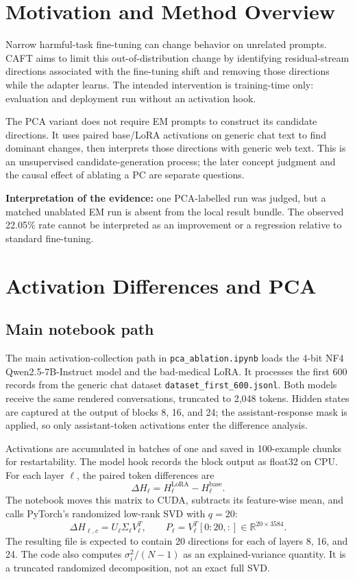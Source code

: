 \documentclass[11pt]{article}
\begin{document}
\section{Motivation and Method Overview}
Narrow harmful-task fine-tuning can change behavior on unrelated prompts. CAFT aims to limit this out-of-distribution change by identifying residual-stream directions associated with the fine-tuning shift and removing those directions while the adapter learns. The intended intervention is training-time only: evaluation and deployment run without an activation hook.

The PCA variant does not require EM prompts to construct its candidate directions. It uses paired base/LoRA activations on generic chat text to find dominant changes, then interprets those directions with generic web text. This is an unsupervised candidate-generation process; the later concept judgment and the causal effect of ablating a PC are separate questions.

\begin{findingbox}
\textbf{Interpretation of the evidence:} one PCA-labelled run was judged, but a matched unablated EM run is absent from the local result bundle. The observed 22.05\% rate cannot be interpreted as an improvement or a regression relative to standard fine-tuning.
\end{findingbox}

\newpage
\section{Activation Differences and PCA}
\subsection{Main notebook path}
The main activation-collection path in \texttt{pca\_ablation.ipynb} loads the 4-bit NF4 Qwen2.5-7B-Instruct model and the bad-medical LoRA. It processes the first 600 records from the generic chat dataset \texttt{dataset\_first\_600.jsonl}. Both models receive the same rendered conversations, truncated to 2,048 tokens. Hidden states are captured at the output of blocks 8, 16, and 24; the assistant-response mask is applied, so only assistant-token activations enter the difference analysis.

Activations are accumulated in batches of one and saved in 100-example chunks for restartability. The model hook records the block output as float32 on CPU. For each layer $\ell$, the paired token differences are
\[
  \Delta H_\ell = H^{\mathrm{LoRA}}_\ell-H^{\mathrm{base}}_\ell.
\]
The notebook moves this matrix to CUDA, subtracts its feature-wise mean, and calls PyTorch's randomized low-rank SVD with $q=20$:
\[
  \Delta H_{\ell,c}=U_\ell\Sigma_\ell V_\ell^T,\qquad
  P_\ell=V_\ell^T[0:20,:]\in\mathbb{R}^{20\times3584}.
\]
The resulting file is expected to contain 20 directions for each of layers 8, 16, and 24. The code also computes $\sigma_i^2/(N-1)$ as an explained-variance quantity. It is a truncated randomized decomposition, not an exact full SVD.
\end{document}
